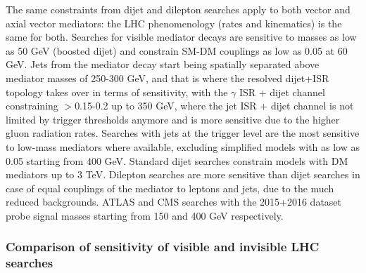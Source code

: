The same constraints from dijet and dilepton searches apply to both vector and axial vector mediators:
the LHC phenomenology (rates and kinematics) is the same for both. Searches for visible mediator decays 
are sensitive to masses as low as 50 GeV (boosted dijet) and constrain SM-DM couplings \gq as low as 
0.05 at 60 GeV. Jets from the mediator decay start being spatially separated above mediator masses of 250-300 GeV, 
and that is where the resolved dijet+ISR topology takes over in terms of sensitivity, with the $\gamma$ ISR + dijet channel
constraining \gq$>$0.15-0.2 up to 350 GeV, where the jet ISR + dijet channel is not limited by
trigger thresholds anymore and is more sensitive due to the higher gluon radiation rates.
Searches with jets at the trigger level are the most sensitive to low-mass mediators where available,
excluding simplified models with \gq as low as 0.05 starting from 400 GeV. 
Standard dijet searches constrain models with DM mediators up to 3 TeV.  
Dilepton searches are more sensitive than dijet searches in case of equal couplings
of the mediator to leptons and jets, due to the much reduced backgrounds. ATLAS and CMS searches
with the 2015+2016 dataset probe signal masses starting from 150 and 400 GeV respectively.  


\subsubsection{Comparison of sensitivity of visible and invisible LHC searches}
\label{sub:comparisonVisibleInvisible}

